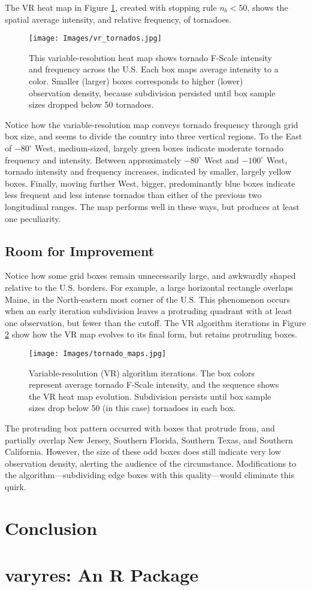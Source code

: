 The VR heat map in Figure \ref{fig:tornado1}, created with stopping rule $n_{b} < 50$, shows the spatial average intensity, and relative frequency, of tornadoes.
        \begin{figure}[H]
      	\centering      
      	\texttt{[image: Images/vr\_tornados.jpg]}
      	\caption{This variable-resolution heat map shows tornado F-Scale intensity and frequency across the U.S. Each box maps average intensity to a color. Smaller (larger) boxes corresponds to higher (lower) observation density, because subdivision persisted until box sample sizes dropped below 50 tornadoes.}
      	\label{fig:tornado1}
        \end{figure}
Notice how the variable-resolution map conveys tornado frequency through grid box size, and seems to divide the country into three vertical regions. To the East of $-80^{\circ}$ West, medium-sized, largely green boxes indicate moderate tornado frequency and intensity. Between approximately $-80^{\circ}$ West and $-100^{\circ}$ West, tornado intensity and frequency increases, indicated by smaller, largely yellow boxes. Finally, moving further West, bigger, predominantly blue boxes indicate less frequent and less intense tornados than either of the previous two longitudinal ranges. The map performs well in these ways, but produces at least one peculiarity.

\subsection{Room for Improvement}

Notice how some grid boxes remain unnecessarily large, and awkwardly shaped relative to the U.S. borders. For example, a large horizontal rectangle overlaps Maine, in the North-eastern most corner of the U.S. This phenomenon occurs when an early iteration subdivision leaves a protruding quadrant with at least one observation, but fewer than the cutoff. The VR algorithm iterations in Figure \ref{fig:tornado2} show how the VR map evolves to its final form, but retains protruding boxes.
        \begin{figure}[H]
      	\centering      
      	\texttt{[image: Images/tornado\_maps.jpg]}
      	\caption{Variable-resolution (VR) algorithm iterations. The box colors represent average tornado F-Scale intensity, and the sequence shows the VR heat map evolution. Subdivision persists until box sample sizes drop below 50 (in this case) tornadoes in each box.}
      	\label{fig:tornado2}
        \end{figure}
The protruding box pattern occurred with boxes that protrude from, and partially overlap New Jersey, Southern Florida, Southern Texas, and Southern California. However, the size of these odd boxes does still indicate very low observation density, alerting the audience of the circumstance. Modifications to the algorithm---subdividing edge boxes with this quality---would eliminate this quirk.

\section{Conclusion}

\section{{\bf varyres}: An R Package}